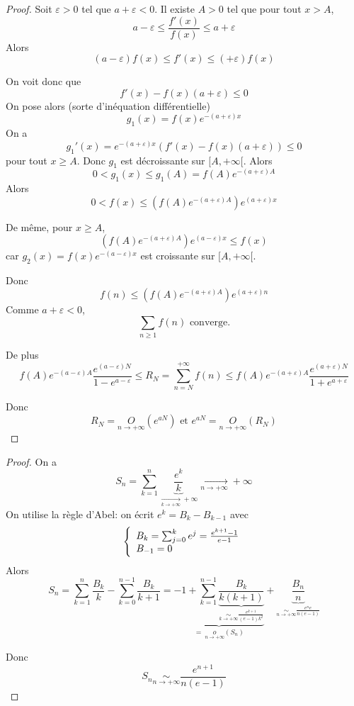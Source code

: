 \begin{proof}
	Soit $\varepsilon>0$ tel que $a+\varepsilon<0$. Il existe $A>0$ tel que pour tout $x>A$, 
	$$a-\varepsilon\leqslant\frac{f'(x)}{f(x)}\leqslant a+\varepsilon$$
	Alors
	$$(a-\varepsilon)f(x)\leqslant f'(x)\leqslant (+\varepsilon)f(x)$$

	On voit donc que 
	$$f'(x)-f(x)(a+\varepsilon)\leqslant0$$
	On pose alors (sorte d'inéquation différentielle) 
	$$g_{1}(x)=f(x)e^{-(a+\varepsilon)x}$$
	On a 
	$$g_{1}'(x)=e^{-(a+\varepsilon)x}\left(f'(x)-f(x)(a+\varepsilon)\right)\leqslant 0$$
	pour tout $x\geqslant A$. Donc $g_{1}$ est décroissante sur $[A,+\infty[$. Alors 
	$$0<g_{1}(x)\leqslant g_{1}(A)=f(A)e^{-(a+\varepsilon)A}$$
	Alors 
	$$0<f(x)\leqslant \left(f(A)e^{-(a+\varepsilon)A}\right)e^{(a+\varepsilon)x}$$

	De même, pour $x\geqslant A$, 
	$$\left(f(A)e^{-(a+\varepsilon)A}\right)e^{(a-\varepsilon)x}\leqslant f(x)$$
	car $g_{2}(x)=f(x)e^{-(a-\varepsilon)x}$ est croissante sur $[A,+\infty[$.

	Donc 
	$$f(n)\leqslant\left(f(A)e^{-(a+\varepsilon)A}\right)e^{(a+\varepsilon)n}$$
	Comme $a+\varepsilon<0$, 
	$$\boxed{\sum_{n\geqslant1}f(n)\text{ converge.}}$$
	
	De plus
	$$f(A)e^{-(a-\varepsilon)A}\frac{e^{(a-\varepsilon)N}}{1-e^{a-\varepsilon}}\leqslant R_{N}=\sum_{n=N}^{+\infty}f(n)\leqslant f(A)e^{-(a+\varepsilon)A}\frac{e^{(a+\varepsilon)N}}{1+e^{a+\varepsilon}}$$

	Donc 
	$$\boxed{R_{N}=\underset{n\to+\infty}{O}\left(e^{aN}\right)\text{ et }e^{aN}=\underset{n\to+\infty}{O}\left(R_{N}\right)}$$
\end{proof}

\begin{proof}
	On a 
	$$S_{n}=\sum_{k=1}^{n}\underbrace{\frac{e^{k}}{k}}_{\xrightarrow[k\to+\infty]{}+\infty}\xrightarrow[n\to+\infty]{}+\infty$$
	On utilise la règle d'Abel: on écrit $e^{k}=B_{k}-B_{k-1}$ avec 
	$$
	\left\{
		\begin{array}[]{ll}
			B_{k}=\sum_{j=0}^{k}e^{j}=\frac{e^{k+1}-1}{e-1}\\
			B_{-1}=0
		\end{array}	
	\right.
	$$
	Alors 
	$$S_{n}=\sum_{k=1}^{n}\frac{B_{k}}{k}-\sum_{k=0}^{n-1}\frac{B_{k}}{k+1}=\underbrace{-1+\sum_{k=1}^{n-1}\underbrace{\frac{B_{k}}{k(k+1)}}_{\underset{k\to+\infty}{\sim}\frac{e^{k+1}}{(e-1)k^{2}}}}_{=~\underset{n\to+\infty}{o}(S_{n})}+\underbrace{\frac{B_{n}}{n}}_{\underset{n\to+\infty}{\sim}\frac{e^{n}e}{n(e-1)}}$$

	Donc 
	$$\boxed{S_{n}\underset{n\to+\infty}{\sim}\frac{e^{n+1}}{n(e-1)}}$$
\end{proof}

